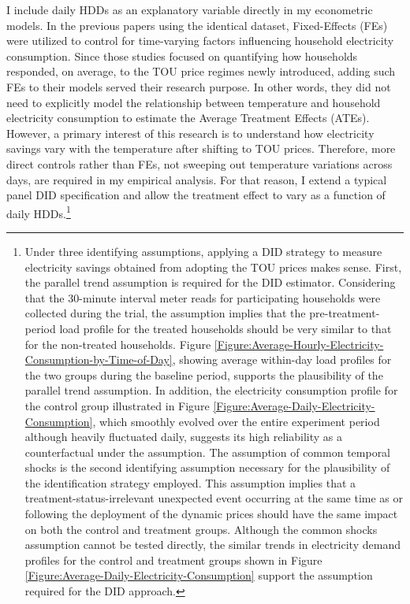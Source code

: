 I include daily HDDs as an explanatory variable directly in my econometric models. In the previous papers using the identical dataset, Fixed-Effects (FEs) were utilized to control for time-varying factors influencing household electricity consumption. Since those studies focused on quantifying how households responded, on average, to the TOU price regimes newly introduced, adding such FEs to their models served their research purpose. In other words, they did not need to explicitly model the relationship between temperature and household electricity consumption to estimate the Average Treatment Effects (ATEs). However, a primary interest of this research is to understand how electricity savings vary with the temperature after shifting to TOU prices. Therefore, more direct controls rather than FEs, not sweeping out temperature variations across days, are required in my empirical analysis. For that reason, I extend a typical panel DID specification and allow the treatment effect to vary as a function of daily HDDs.\footnote{Under three identifying assumptions, applying a DID strategy to measure electricity savings obtained from adopting the TOU prices makes sense. First, the parallel trend assumption is required for the DID estimator. Considering that the 30-minute interval meter reads for participating households were collected during the trial, the assumption implies that the pre-treatment-period load profile for the treated households should be very similar to that for the non-treated households. Figure \ref{Figure:Average-Hourly-Electricity-Consumption-by-Time-of-Day}, showing average within-day load profiles for the two groups during the baseline period, supports the plausibility of the parallel trend assumption. In addition, the electricity consumption profile for the control group illustrated in Figure \ref{Figure:Average-Daily-Electricity-Consumption}, which smoothly evolved over the entire experiment period although heavily fluctuated daily, suggests its high reliability as a counterfactual under the assumption.
The assumption of common temporal shocks is the second identifying assumption necessary for the plausibility of the identification strategy employed. This assumption implies that a treatment-status-irrelevant unexpected event occurring at the same time as or following the deployment of the dynamic prices should have the same impact on both the control and treatment groups. Although the common shocks assumption cannot be tested directly, the similar trends in electricity demand profiles for the control and treatment groups shown in Figure \ref{Figure:Average-Daily-Electricity-Consumption} support the assumption required for the DID approach.
}
